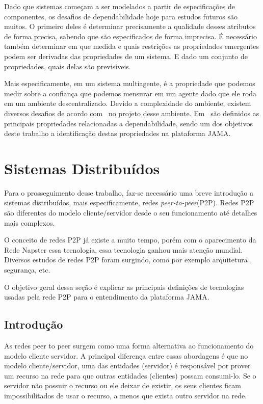 Dado que sistemas começam a ser modelados a partir de especificações de componentes, os desafios de dependabilidade hoje para estudos futuros são muitos. O primeiro deles é determinar precisamente a qualidade desses atributos de forma precisa, sabendo que são especificados de forma imprecisa. É necessário também determinar em que medida e quais restrições as propriedades emergentes podem ser derivadas das propriedades de um sistema. E dado um conjunto de propriedades, quais delas são previsíveis.

Mais especificamente, em um sistema multiagente, é a propriedade que podemos medir sobre a confiança que podemos mensurar em um agente dado que ele roda em um ambiente descentralizado. Devido a complexidade do ambiente, existem diversos desafios de acordo com~\cite{hoffman08} no projeto desse ambiente. Em~\cite{algirdas04} são definidos as principais propriedades relacionadas a dependabilidade, sendo um dos objetivos deste trabalho a identificação destas propriedades na plataforma JAMA.

\section{Sistemas Distribuídos}

Para o prosseguimento desse trabalho, faz-se necessário uma breve introdução a sistemas distribuídos, mais especificamente, redes \emph{peer-to-peer}(P2P). Redes P2P são diferentes do modelo cliente/servidor desde o seu funcionamento até detalhes mais complexos.

O conceito de redes P2P já existe a muito tempo, porém com o aparecimento da Rede Napster essa tecnologia, essa tecnologia ganhou mais atenção mundial. Diversos estudos de redes P2P foram surgindo, como por exemplo arquitetura , segurança, etc.

O objetivo geral dessa seção é explicar as principais definições de tecnologias usadas pela rede P2P para o entendimento da plataforma JAMA.

\subsection{Introdução}

As redes peer to peer surgem como uma forma alternativa ao funcionamento do modelo cliente servidor. A principal diferença entre essas abordagens é que no modelo cliente/servidor, uma das entidades (servidor) é responsável por prover um recurso na rede para que outras entidades (clientes) possam consumi-lo. Se o servidor não possuir o recurso ou ele deixar de existir, os seus clientes ficam impossibilitados de usar o recurso, a menos que exista outro servidor na rede.

